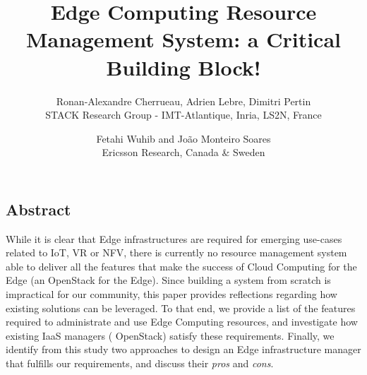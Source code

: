 \documentclass[letterpaper,twocolumn,10pt]{article}
\begin{document}
\date{}

\title{\Large Edge Computing Resource Management System: a Critical Building Block!}

\author{
{\rm Ronan-Alexandre Cherrueau, Adrien Lebre, Dimitri Pertin}\\
STACK Research Group - IMT-Atlantique, Inria, LS2N, France
\and
{\rm Fetahi Wuhib and  João Monteiro Soares}\\
Ericsson Research, Canada \& Sweden\\
} %

\maketitle

\thispagestyle{empty}


\subsection*{Abstract}
While it is clear that Edge infrastructures are required for emerging
use-cases related to IoT, VR or NFV, there is currently no resource management
system able to deliver all the features that make the success of
Cloud Computing for the Edge (\eg an OpenStack for the Edge).
%
Since building a system from scratch is impractical for our community,
this paper provides reflections regarding 
how existing solutions can be leveraged.
%
To that end, we provide a list of the features required to administrate and use
Edge Computing resources, and investigate how existing IaaS managers (\ie
OpenStack) satisfy these requirements. Finally, we identify from this study two
approaches to design an Edge infrastructure manager that fulfills our
requirements, and discuss their \emph{pros} and \emph{cons}.






% 
% 




{\footnotesize
}

\theendnotes
\end{document}
